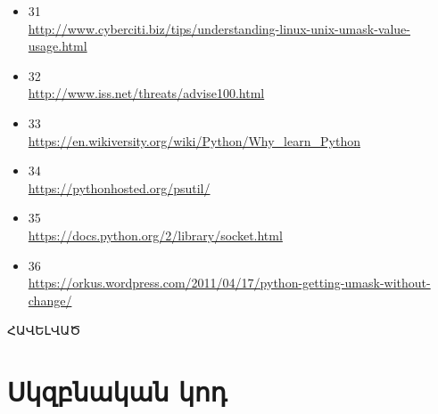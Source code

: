 \documentclass[a4paper,12pt]{article}
\begin{document}
\begin{sloppypar}
\begin{itemize}
\item 31 \\ 
	\url{http://www.cyberciti.biz/tips/understanding-linux-unix-umask-value-usage.html}
\item 32 \\ 
	\url{http://www.iss.net/threats/advise100.html}
\item 33 \\ 
	\url{https://en.wikiversity.org/wiki/Python/Why\_learn\_Python}
\item 34 \\ 
	\url{https://pythonhosted.org/psutil/}
\item 35 \\ 
	\url{https://docs.python.org/2/library/socket.html}
\item 36 \\ 
	\url{https://orkus.wordpress.com/2011/04/17/python-getting-umask-without-change/}
\end{itemize}




\newpage
\vspace*{\fill}
\begingroup
\centering
\centerline{\Huge{ՀԱՎԵԼՎԱԾ}}
\endgroup
\vspace*{\fill}
\newpage


\section*{Սկզբնական կոդ}



\end{sloppypar}
\end{document}
